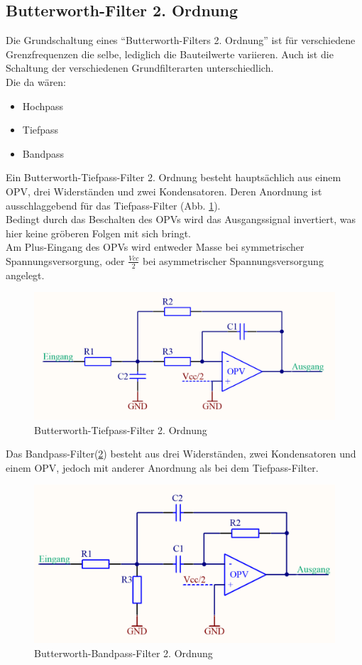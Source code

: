 \subsection{Butterworth-Filter 2. Ordnung}\label{subsec:3.3.1}
Die Grundschaltung eines \enquote{Butterworth-Filters 2. Ordnung} ist für verschiedene Grenzfrequenzen die selbe, lediglich die Bauteilwerte variieren. Auch ist die Schaltung der verschiedenen Grundfilterarten unterschiedlich. \\
Die da wären: 
\begin{itemize}
	\item Hochpass
	\item Tiefpass
	\item Bandpass
\end{itemize}
Ein Butterworth-Tiefpass-Filter 2. Ordnung besteht hauptsächlich aus einem OPV, drei Widerständen und zwei Kondensatoren. Deren Anordnung ist ausschlaggebend für das Tiefpass-Filter (Abb. \ref{fig:3.3.2.1}).\\ 
Bedingt durch das Beschalten des OPVs wird das Ausgangssignal invertiert, was hier keine gröberen Folgen mit sich bringt.\\ 
Am Plus-Eingang des OPVs wird entweder Masse bei symmetrischer Spannungsversorgung, oder $\frac{Vcc}{2}$ bei asymmetrischer Spannungsversorgung angelegt.
\begin{figure} [H]
	\centering
	\includegraphics[width=1\textwidth]{img/Print3/TPFilterButterworth2Ordnung.PNG}
	\caption{Butterworth-Tiefpass-Filter 2. Ordnung}
	\label {fig:3.3.2.1}
\end{figure}
Das Bandpass-Filter(\ref{fig:3.3.2.2}) besteht aus drei Widerständen, zwei Kondensatoren und einem OPV, jedoch mit anderer Anordnung als bei dem Tiefpass-Filter.
\begin{figure} [H]
	\centering
	\includegraphics[width=1\textwidth]{img/Print4/BPFilter-Butterworth2Ordnung.PNG}
	\caption{Butterworth-Bandpass-Filter 2. Ordnung}
	\label {fig:3.3.2.2}
\end{figure}

